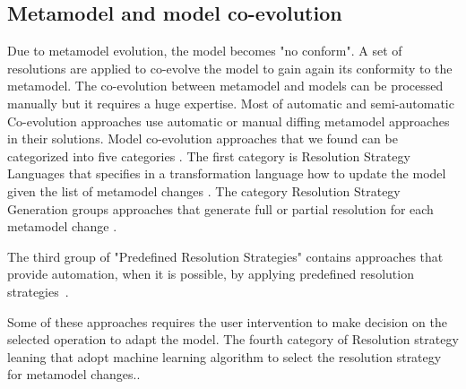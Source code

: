 \subsection{Metamodel and model co-evolution}
Due to metamodel evolution, the model becomes "no conform". A set of resolutions are applied to co-evolve the model to gain again its conformity to the metamodel.
 The co-evolution between metamodel and models can be processed manually but it requires a huge expertise. 
 Most of automatic and semi-automatic Co-evolution  approaches use automatic or manual diffing metamodel approaches in their solutions. Model co-evolution approaches that we found can be categorized into five categories \cite{Hebig2017}. The first category is Resolution Strategy Languages that specifies in a transformation language how to update the model given the list of metamodel changes \cite{10.1007/978-3-540-87875-9_44,sprinkle2004domain,wimmer2010using,10.1007/978-3-642-30476-7_13,10.1007/978-3-642-38883-5_10,10.1007/s10270-012-0313-5,10.1007/s10270-012-0296-2}. The category Resolution Strategy Generation groups approaches that generate full or partial resolution for each metamodel change \cite{del2007semi,de2008generating,garces2009managing,meyers2011generic,anguel2014using}.
 
 
 The third group of "Predefined Resolution Strategies" contains approaches that provide automation, when it is possible, by applying predefined resolution strategies \cite{hossler2005coevolution,florez2012coevolution,fernandez2013adapting,wachsmuth2007metamodel,cicchetti2009managing,van2011generic,becker2007process,herrmannsdoerfer2009operation,wittern2013determining}. 
 
 
  Some of these approaches requires the user intervention to make decision on the selected operation to adapt the model.
  The fourth category of Resolution strategy leaning that adopt machine learning algorithm to select the resolution strategy for metamodel changes.\cite{anguel2013towards}.%
 

